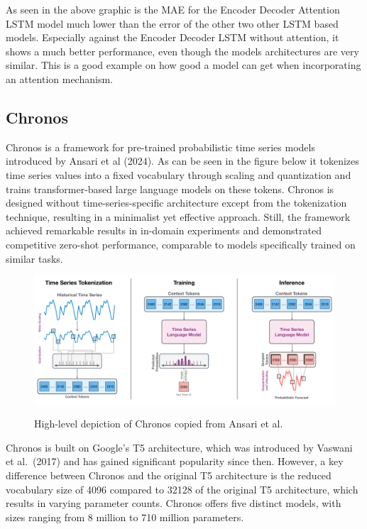 \documentclass[a4paper]{article}
\begin{document}
    As seen in the above graphic is the MAE for the Encoder Decoder
Attention LSTM model much lower than the error of the other two other
LSTM based models. Especially against the Encoder Decoder LSTM without
attention, it shows a much better performance, even though the models
architectures are very similar. This is a good example on how good a
model can get when incorporating an attention mechanism.

    \subsection{Chronos}\label{chronos}

    Chronos is a framework for pre-trained probabilistic time series models
introduced by Ansari et al (2024). As can be seen in the figure below it
tokenizes time series values into a fixed vocabulary through scaling and
quantization and trains transformer-based large language models on these
tokens. Chronos is designed without time-series-specific architecture
except from the tokenization technique, resulting in a minimalist yet
effective approach. Still, the framework achieved remarkable results in
in-domain experiments and demonstrated competitive zero-shot
performance, comparable to models specifically trained on similar tasks.

\begin{figure}
\centering
{\includegraphics[keepaspectratio]{src/Chronos_Process.png}}
\caption{High-level depiction of Chronos copied from Ansari et al.}
\end{figure}

Chronos is built on Google's T5 architecture, which was introduced by
Vaswani et al.~(2017) and has gained significant popularity since then.
However, a key difference between Chronos and the original T5
architecture is the reduced vocabulary size of 4096 compared to 32128 of
the original T5 architecture, which results in varying parameter counts.
Chronos offers five distinct models, with sizes ranging from 8 million
to 710 million parameters.
\end{document}
